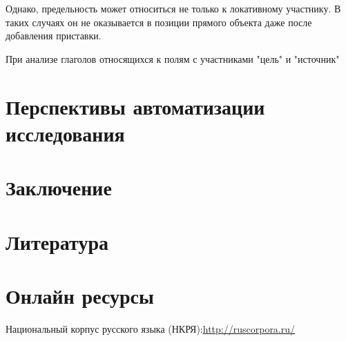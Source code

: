 Однако, предельность может относиться не только к локативному участнику. В таких случаях он не оказывается в позиции прямого объекта даже после добавления приставки.

\par 

\par При анализе глаголов относящихся к полям с участниками "цель" и "источник"


\section{Перспективы автоматизации исследования}


\section{Заключение} \label{final}


\pagebreak
\section{Литература}
\renewcommand{\bibsection}{}
 

\section{Онлайн ресурсы}







\noindent \hypertarget{rusc}{Национальный корпус русского языка (НКРЯ)}:\;\url{http://ruscorpora.ru/} \medskip



